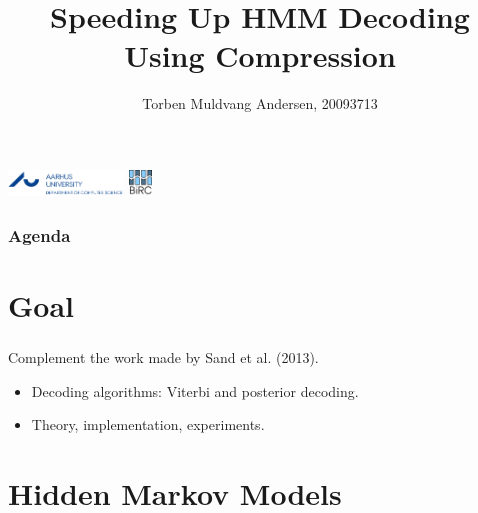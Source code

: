 \documentclass[english,notes]{beamer}
\title{Speeding Up HMM Decoding Using Compression}
\author{Torben Muldvang Andersen, 20093713}
\date{\protect\formatdate{24}{06}{2015}}
\begin{document}
\begin{frame}
  \maketitle
  \includegraphics[height=7mm, trim=0 0 40mm 0, clip]{../logo}
  \hfill
  \includegraphics[height=7mm]{../BiRC-logo}
\end{frame}

\begin{frame}
  \frametitle{Agenda}
  \tableofcontents{}
\end{frame}

\section{Goal}

\begin{frame}
  \frametitle{\insertsection}
  Complement the work made by Sand et al. (2013).
  \begin{itemize}
  \item Decoding algorithms: Viterbi and posterior decoding.
  \item Theory, implementation, experiments.
  \end{itemize}
\end{frame}

\section{Hidden Markov Models}
\end{document}
